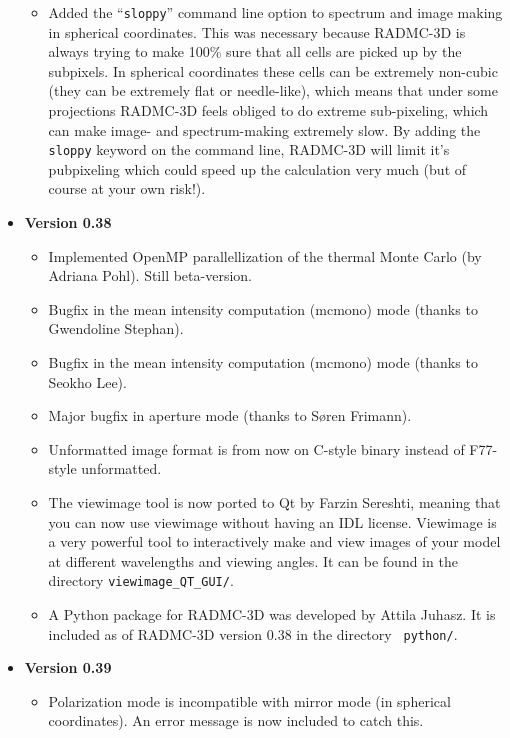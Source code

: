 \documentclass{report}
\begin{document}
\begin{itemize}
\begin{itemize}
  \item Added the ``{\small\tt sloppy}'' command line option to spectrum and
    image making in spherical coordinates. This was necessary because
    RADMC-3D is always trying to make 100\% sure that all cells are picked
    up by the subpixels. In spherical coordinates these cells can be
    extremely non-cubic (they can be extremely flat or needle-like), which
    means that under some projections RADMC-3D feels obliged to do extreme
    sub-pixeling, which can make image- and spectrum-making extremely slow.
    By adding the {\small\tt sloppy}  keyword on the command line, RADMC-3D
    will limit it's pubpixeling which could speed up the calculation very
    much (but of course at your own risk!).
  \end{itemize}
\item {\bf Version 0.38}\\
  \begin{itemize}
  \item Implemented OpenMP parallellization of the thermal Monte Carlo (by
    Adriana Pohl). Still beta-version.
  \item Bugfix in the mean intensity computation (mcmono) mode (thanks to Gwendoline Stephan).
  \item Bugfix in the mean intensity computation (mcmono) mode (thanks to Seokho Lee).
  \item Major bugfix in aperture mode (thanks to S\o ren Frimann). 
  \item Unformatted image format is from now on C-style binary instead of
    F77-style unformatted.
  \item The viewimage tool is now ported to Qt by Farzin Sereshti, meaning
    that you can now use viewimage without having an IDL license. Viewimage
    is a very powerful tool to interactively make and view images of your
    model at different wavelengths and viewing angles. It can be found
    in the directory {\small\tt viewimage\_QT\_GUI/}.
  \item A Python package for RADMC-3D was developed by Attila Juhasz. It is
    included as of RADMC-3D version 0.38 in the directory {\small\tt
      python/}.
  \end{itemize}
\item {\bf Version 0.39}\\
  \begin{itemize}
  \item Polarization mode is incompatible with mirror mode (in spherical
    coordinates). An error message is now included to catch this.

\end{itemize}
\end{itemize}
\end{document}
